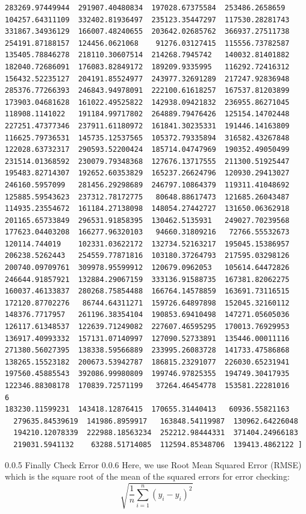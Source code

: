 \documentclass[sigconf]{acmart}
\begin{document}
\begin{lstlisting}
283269.97449944  291907.40480834  197028.67375584  253486.2658659
104257.64311109  332402.81936497  235123.35447297  117530.28281743
331867.34936129  166007.48240655  203642.02685762  366937.27511738
254191.87188157  124456.0621068    91276.03127415  115556.73782587
135405.78846278  218110.30607514  214268.7945742   140032.81401882
182040.72686091  176083.82849172  189209.9335995   116292.72416312
156432.52235127  204191.85524977  243977.32691289  217247.92836948
285376.77266393  246843.94978091  222100.61618257  167537.81203899
173903.04681628  161022.49525822  142938.09421832  236955.86271045
118908.1141022   191184.99717802  264889.79476426  125154.14702448
227251.47377346  237911.61180972  161841.30235331  191446.14163809
116625.79736531  145735.12537565  105372.79335894  316582.43267848
122028.63732317  290593.52200424  185714.04747969  190352.49050499
231514.01368592  230079.79348368  127676.13717555  211300.51925447
195483.82714307  192652.60353829  165237.26624796  120930.29413027
246160.5957099   281456.29298689  246797.10864379  119311.41048692
125885.59543623  237312.78172775   80648.88617473  121685.26043487
114935.23554672  161184.27138098  148054.27442727  131650.06362918
201165.65733849  296531.91858395  130462.5135931   249027.70239568
177623.04403208  166277.96320103   94660.31809216   72766.55532673
120114.744019    102331.03622172  132734.52163217  195045.15386957
206238.5262443   254559.77871816  103180.37264793  217595.03298126
200740.09709761  309978.95599912  120679.0962053   105614.64472826
246644.91857921  132884.29067159  333136.91588735  167381.82062275
160037.46133837  280268.75854488  166764.14578859  163691.73116515
172120.87702276   86744.64311271  159726.64897898  152045.32160112
148376.7717957   261196.38354104  190853.69410498  147271.05605036
126117.61348537  122639.71249082  227607.46595295  170013.76929953
136917.40993332  157131.07140997  127090.52733891  135446.00011116
271380.56027395  138338.59566889  233995.26083728  141733.47586868
138265.15523182  200673.53942787  186815.23291077  226030.65231941
197560.45885543  392086.99980809  199746.97825355  194749.30417935
122346.88308178  170839.72571199   37264.46454778  153581.22281016
6
183230.11599231  143418.12876415  170655.31440413   60936.55821163
  279635.84539619  141986.8959917   163848.54119987  130962.64226048
  194210.12078339  222988.18563234  252212.98444331  371404.24966183
  219031.5941132    63288.51714085  112594.85348706  139413.4862122 ]
\end{lstlisting}

0.0.5 Finally Check Error
0.0.6 Here, we use Root Mean Squared Error (RMSE) which is the square root of the mean of the squared errors for error checking:
$$\sqrt{\frac 1n\sum_{i=1}^n(y_i-\hat{y}_i)^2}$$
\end{document}
